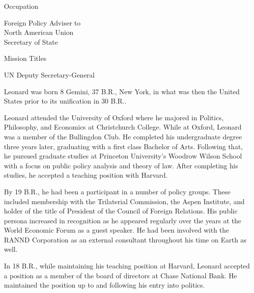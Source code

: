 {        \bTR
            \bTC Occupation \eTC
            \bTC 
                \startitemize[4]
                \startpacked
                \item Foreign Policy Adviser to\\North American Union\\Secretary of State
                \stoppacked
                \stopitemize
            \eTC
        \eTR
        
        \bTR
            \bTC Mission Titles \eTC
            \bTC 
                \startitemize[4]
                \startpacked
                \item UN Deputy Secretary-General
                \stoppacked
                \stopitemize
            \eTC            
        \eTR
    \eTABLEbody

\eTABLE
}

Leonard was born 8 Gemini, 37 B.R., New York, in what was then the United States prior to its unification in 30 B.R..

Leonard attended the University of Oxford where he majored in Politics, Philosophy, and Economics at Christchurch College. While at Oxford, Leonard was a member of the Bullingdon Club. He completed his undergraduate degree three years later, graduating with a first class Bachelor of Arts. Following that, he pursued graduate studies at Princeton University's Woodrow Wilson School with a focus on public policy analysis and theory of law. After completing his studies, he accepted a teaching position with Harvard.

By 19 B.R., he had been a participant in a number of policy groups. These included membership with the Trilaterial Commission, the Aspen Institute, and holder of the title of President of the Council of Foreign Relations. His public persona increased in recognition as he appeared regularly over the years at the World Economic Forum as a guest speaker. He had been involved with the RANND Corporation as an external consultant throughout his time on Earth as well.

In 18 B.R., while maintaining his teaching position at Harvard, Leonard accepted a position as a member of the board of directors at Chase National Bank. He maintained the position up to and following his entry into politics.

